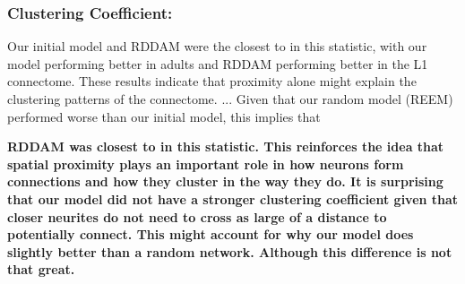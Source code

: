 \subsubsection{Clustering Coefficient:} Our initial model and RDDAM were the closest to \ce in this statistic, with our model performing better in adults and RDDAM performing better in the L1 connectome. These results indicate that proximity alone might explain the clustering patterns of the \ce connectome. ...
Given that our random model (REEM) performed worse than our initial model, this implies that 

\textbf{RDDAM was closest to \ce in this statistic. This reinforces the idea that spatial proximity plays an important role in how neurons form connections and how they cluster in the way they do. It is surprising that our model did not have a stronger clustering coefficient given that closer neurites do not need to cross as large of a distance to potentially connect. This might account for why our model does slightly better than a random network. Although this difference is not that great.}